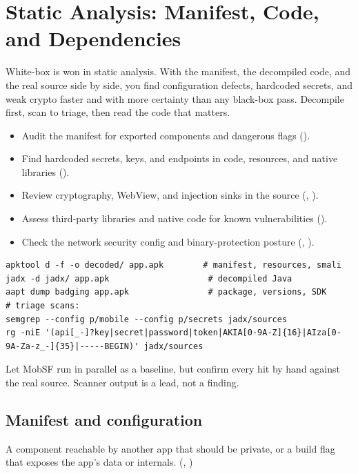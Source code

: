 \chapter{Static Analysis: Manifest, Code, and Dependencies}\label{ch:static}

White-box is won in static analysis. With the manifest, the decompiled code, and the real source side by side, you find configuration defects, hardcoded secrets, and weak crypto faster and with more certainty than any black-box pass. Decompile first, scan to triage, then read the code that matters.

\begin{objectives}
\begin{itemize}[leftmargin=12pt]
\item Audit the manifest for exported components and dangerous flags ().
\item Find hardcoded secrets, keys, and endpoints in code, resources, and native libraries ().
\item Review cryptography, WebView, and injection sinks in the source (, ).
\item Assess third-party libraries and native code for known vulnerabilities ().
\item Check the network security config and binary-protection posture (, ).
\end{itemize}
\end{objectives}

\begin{lab}
\begin{lstlisting}
apktool d -f -o decoded/ app.apk        # manifest, resources, smali
jadx -d jadx/ app.apk                    # decompiled Java
aapt dump badging app.apk                # package, versions, SDK
# triage scans:
semgrep --config p/mobile --config p/secrets jadx/sources
rg -niE '(api[_-]?key|secret|password|token|AKIA[0-9A-Z]{16}|AIza[0-9A-Za-z_-]{35}|-----BEGIN)' jadx/sources
\end{lstlisting}
Let MobSF run in parallel as a baseline, but confirm every hit by hand against the real source. Scanner output is a lead, not a finding.
\end{lab}

\section{Manifest and configuration}
\begin{findingbox}
A component reachable by another app that should be private, or a build flag that exposes the app's data or internals. (, )
\end{findingbox}

